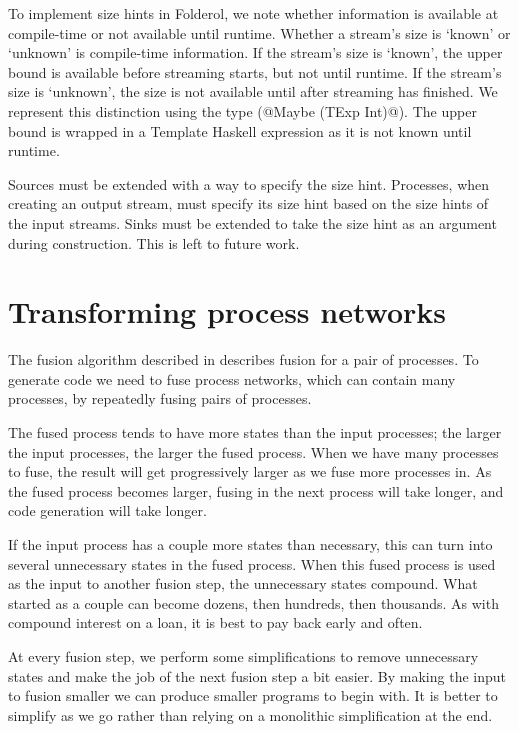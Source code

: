 To implement size hints in Folderol, we note whether information is available at compile-time or not available until runtime.
Whether a stream's size is `known' or `unknown' is compile-time information.
If the stream's size is `known', the upper bound is available before streaming starts, but not until runtime.
If the stream's size is `unknown', the size is not available until after streaming has finished.
We represent this distinction using the type (@Maybe (TExp Int)@).
The upper bound is wrapped in a Template Haskell expression as it is not known until runtime.

Sources must be extended with a way to specify the size hint.
Processes, when creating an output stream, must specify its size hint based on the size hints of the input streams.
Sinks must be extended to take the size hint as an argument during construction.
This is left to future work.


\section{Transforming process networks}

The fusion algorithm described in  describes fusion for a pair of processes.
To generate code we need to fuse process networks, which can contain many processes, by repeatedly fusing pairs of processes.

The fused process tends to have more states than the input processes; the larger the input processes, the larger the fused process.
When we have many processes to fuse, the result will get progressively larger as we fuse more processes in.
As the fused process becomes larger, fusing in the next process will take longer, and code generation will take longer.

If the input process has a couple more states than necessary, this can turn into several unnecessary states in the fused process.
When this fused process is used as the input to another fusion step, the unnecessary states compound.
What started as a couple can become dozens, then hundreds, then thousands.
As with compound interest on a loan, it is best to pay back early and often.

At every fusion step, we perform some simplifications to remove unnecessary states and make the job of the next fusion step a bit easier.
By making the input to fusion smaller we can produce smaller programs to begin with.
It is better to simplify as we go rather than relying on a monolithic simplification at the end.

